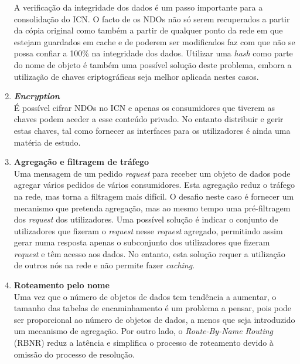 \documentclass[conference]{IEEEtran}
\begin{document}
\begin{enumerate}
A verifica\c{c}\~{a}o da integridade dos dados \'{e} um passo importante para a consolida\c{c}\~{a}o do ICN. O facto de os NDOs n\~{a}o s\'{o} serem recuperados a partir da cópia original como tamb\'{e}m a partir de qualquer ponto da rede em que estejam guardados em cache e de poderem ser modificados faz com que n\~{a}o se possa confiar a 100\% na integridade dos dados. Utilizar uma \textit{hash} como parte do nome de objeto \'{e} tamb\'{e}m uma poss\'{i}vel solu\c{c}\~{a}o deste problema, embora a utiliza\c{c}\~{a}o de chaves criptogr\'{a}ficas seja melhor aplicada nestes casos.\\

\item \textbf{\textit{Encryption}}\\

\'{E} poss\'{i}vel cifrar NDOs no ICN e apenas os consumidores que tiverem as chaves podem aceder a esse conte\'{u}do privado. No entanto distribuir e gerir estas chaves, tal como fornecer as interfaces para os utilizadores \'{e} ainda uma mat\'{e}ria de estudo.\\

\item \textbf{Agrega\c{c}\~{a}o e filtragem de tr\'{a}fego}\\

Uma mensagem de um pedido \textit{request} para receber um objeto de dados pode agregar v\'{a}rios pedidos de v\'{a}rios consumidores. Esta agrega\c{c}\~{a}o reduz o tr\'{a}fego na rede, mas torna a filtragem mais dif\'{i}cil. O desafio neste caso \'{e} fornecer um mecanismo que pretenda agrega\c{c}\~{a}o, mas ao mesmo tempo uma pr\'{e}-filtragem dos \textit{request} dos utilizadores. Uma poss\'{i}vel solu\c{c}\~{a}o \'{e} indicar o conjunto de utilizadores que fizeram o \textit{request} nesse \textit{request} agregado, permitindo assim gerar numa resposta apenas o subconjunto dos utilizadores que fizeram \textit{request} e t\^{e}m acesso aos dados. No entanto, esta solu\c{c}\~{a}o requer a utiliza\c{c}\~{a}o de outros n\'{o}s na rede e n\~{a}o permite fazer \textit{caching}.\\

\item \textbf{Roteamento pelo nome}\\

Uma vez que o n\'{u}mero de objetos de dados tem tend\^{e}ncia a aumentar, o tamanho das tabelas de encaminhamento \'{e} um problema a pensar, pois pode ser proporcional ao n\'{u}mero de objetos de dados, a menos que seja introduzido um mecanismo de agrega\c{c}\~{a}o. Por outro lado, o \textit{Route-By-Name Routing} (RBNR) reduz a lat\^{e}ncia e simplifica o processo de roteamento devido \`{a} omiss\~{a}o do processo de resolu\c{c}\~{a}o.\\
\end{enumerate}
\end{document}
